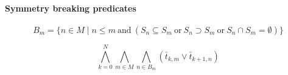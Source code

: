 \documentclass[]{llncs}
\begin{document}
\paragraph{Symmetry breaking predicates}


\begin{equation}
B_m = \{ n \in M \mid n \leq m \mathrm{~and~} ( S_n \subseteq S_m \mathrm{~or~} S_n \supset S_m \mathrm{~or~} S_n \cap S_m = \emptyset) \}
\end{equation}

\begin{equation}
\bigwedge_{k=0}^{N} \bigwedge_{m \in M} \bigwedge_{n \in B_m} (\bar t_{k,m} \lor \bar t_{k+1,n}) 
\end{equation}
\end{document}
